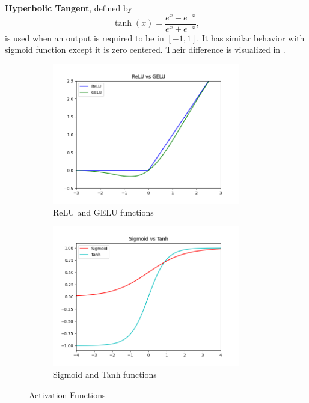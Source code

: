 \textbf{Hyperbolic Tangent}, defined by
\begin{equation}
\label{eqn:tanh_fcn}
\tanh(x) = \frac{e^x - e^{-x}}{e^x + e^{-x}},
\end{equation} 
is used when an output is required to be in $[-1,1]$. It has similar behavior with sigmoid function except it is zero centered. Their difference is visualized in . 

\begin{figure}
	\begin{subfigure}{.5\textwidth}
		\centering
		\includegraphics[width=0.9\textwidth]{figures/ml_theory/relu_gelu.png}
		\caption{ReLU and GELU functions}
		\label{fig:relu_gelu}
	\end{subfigure}
	\begin{subfigure}{.5\textwidth}
		\centering
		\includegraphics[width=0.9\textwidth]{figures/ml_theory/sigmoid_tanh.png}
		\caption{Sigmoid and Tanh functions}
		\label{fig:sigmoid_tanh}
	\end{subfigure}
	\caption{Activation Functions}
	\label{fig:activation_functions}
\end{figure}

